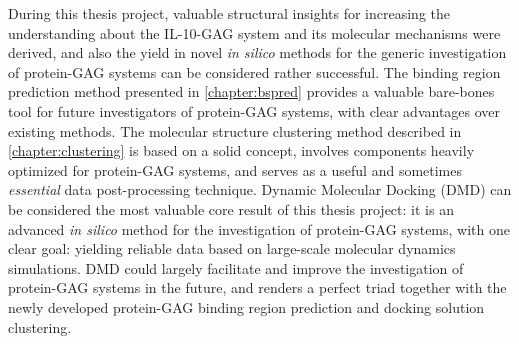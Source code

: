 During this thesis project, valuable structural insights for increasing the
understanding about the IL-10-GAG system and its molecular mechanisms were
derived, and also the yield in novel \textit{in silico} methods for the generic
investigation of protein-GAG systems can be considered rather successful. The
binding region prediction method presented in \cref{chapter:bspred} provides a
valuable bare-bones tool for future investigators of protein-GAG systems, with
clear advantages over existing methods. The molecular structure clustering
method described in \cref{chapter:clustering} is based on a solid concept,
involves components heavily optimized for protein-GAG systems, and serves as a
useful and sometimes \textit{essential} data post-processing technique. Dynamic
Molecular Docking (DMD) can be considered the most valuable core result of this
thesis project: it is an advanced \textit{in silico} method for the
investigation of protein-GAG systems, with one clear goal: yielding reliable
data based on large-scale molecular dynamics simulations. DMD could largely
facilitate and improve the investigation of protein-GAG systems in the future,
and renders a perfect triad together with the newly developed protein-GAG
binding region prediction and docking solution clustering.

